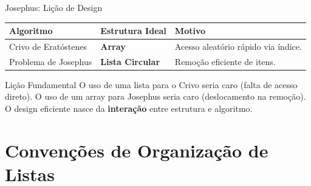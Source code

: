 \documentclass[aspectratio=169]{beamer}
\begin{document}
\begin{frame}{Josephus: Lição de Design}
    \begin{table}[]
        \small
        \begin{tabular}{|l|l|l|}
        \hline
        \textbf{Algoritmo} & \textbf{Estrutura Ideal} & \textbf{Motivo} \\ \hline
        Crivo de Eratóstenes & \textbf{Array} & Acesso aleatório rápido via índice. \\ \hline
        Problema de Josephus & \textbf{Lista Circular} & Remoção eficiente de itens. \\ \hline
        \end{tabular}
    \end{table}

    \vspace{0.3cm}
    \begin{alertblock}{Lição Fundamental}
        O uso de uma lista para o Crivo seria caro (falta de acesso direto). O uso de um array para Josephus seria caro (deslocamento na remoção). O design eficiente nasce da \textbf{interação} entre estrutura e algoritmo.
    \end{alertblock}
\end{frame}


\section{Convenções de Organização de Listas}
\end{document}
